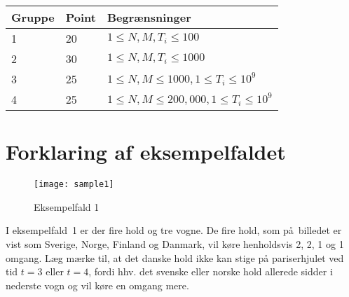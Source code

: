 \noindent
\begin{tabular}{| l | l | l |}
\hline
Gruppe & Point & Begrænsninger \\ \hline
1     & 20    & $1 \le N, M, T_i \le 100$ \\ \hline
2     & 30    & $1 \le N, M, T_i \le 1000$ \\ \hline
3     & 25    & $1 \le N, M \le 1000, 1 \le T_i \le 10^9$ \\ \hline
4     & 25    & $1 \le N, M \le 200,000, 1 \le T_i \le 10^9$ \\ \hline
\end{tabular}

\section*{Forklaring af eksempelfaldet}

\begin{figure}[h]
	\centering
\texttt{[image: sample1]}
\caption{Eksempelfald 1}
\end{figure}

I eksempelfald~1 er der fire hold og tre vogne.
De fire hold, som på billedet er vist som Sverige, Norge, Finland og Danmark, vil køre henholdsvis 2, 2, 1 og 1 omgang.
Læg mærke til, at det danske hold ikke kan stige på pariserhjulet ved tid $t=3$ eller $t=4$, fordi hhv. det svenske eller norske hold allerede sidder i nederste vogn og vil køre en omgang mere.
